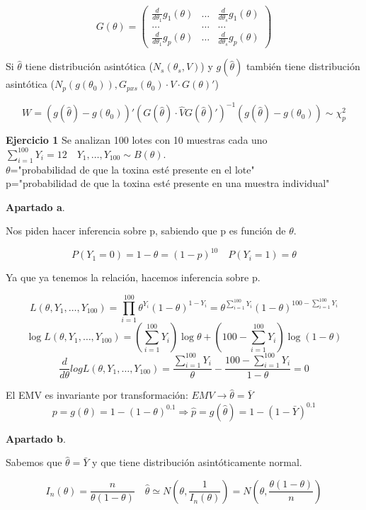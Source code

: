 \[
G(\theta)=
\begin{pmatrix}
    \frac{d}{d \theta_1} g_1(\theta) & \dots & \frac{d}{d \theta_s} g_1(\theta)\\
    \dots &\dots & \dots \\
    \frac{d}{d \theta_1} g_p(\theta) & \dots &\frac{d}{d \theta_s} g_p(\theta)
\end{pmatrix}
\]

Si $\widehat{\theta}$ tiene distribución asintótica ($N_s(\theta_s,V)$)
y $g(\widehat{\theta})$ también tiene distribución asintótica ($N_p(g(\theta_0)),G_{pxs}(\theta_0)\cdot V \cdot G(\theta)'$)

\[
W=(g(\widehat{\theta})-g(\theta_0))'(G(\widehat{\theta})\cdot \widehat{V} G(\widehat{\theta})')^{-1}(g(\widehat{\theta})-g(\theta_0)) \sim \chi^2_p
\]

\textbf{Ejercicio 1}
Se analizan 100 lotes con 10 muestras cada uno $\sum_{i=1}^{100}Y_i=12 \quad Y_1,\dots,Y_{100} \sim B(\theta)$.
\\$\theta$="probabilidad de que la toxina esté presente en el lote"
\\ p="probabilidad de que la toxina esté presente en una muestra individual"

\textbf{Apartado a}.

Nos piden hacer inferencia sobre p, sabiendo que p es función de $\theta$.

\[
P(Y_1=0)=1-\theta=(1-p)^{10} \quad P(Y_i=1)=\theta
\]

Ya que ya tenemos la relación, hacemos inferencia sobre p.

\[
L(\theta,Y_1,\dots,Y_{100})=\prod_{i=1}^{100} \theta^{Y_i}(1-\theta)^{1-Y_i}=\theta^{\sum_{i=1}^{100} Y_i}(1-\theta)^{100-\sum_{i=1}^{100} Y_i}
\]\[ \log L(\theta,Y_1,\dots,Y_{100})=(\sum_{i=1}^{100}Y_i) \log \theta + (100-\sum_{i=1}^{100}Y_i) \log (1-\theta)
\]\[ \frac{d}{d \theta} log L(\theta,Y_1,\dots,Y_{100})= \frac{\sum_{i=1}^{100}Y_i}{\theta} - \frac{100 - \sum_{i=1}^{100}Y_i}{1-\theta}=0
\]

El EMV es invariante por transformación: $EMV \to \widehat{\theta}=\bar{Y}$
\[
    p=g(\theta)=1-(1-\theta)^{0.1}\Longrightarrow \widehat{p}=g(\widehat{\theta})=1-(1-\bar{Y})^{0.1}
\]

\textbf{Apartado b}.

Sabemos que $\widehat{\theta}=\bar{Y}$ y que tiene distribución asintóticamente normal.

\[
I_n(\theta)=\frac{n}{\theta(1-\theta)} \quad \widehat{\theta}\simeq N(\theta,\frac{1}{I_n(\theta)}) = N(\theta,\frac{\theta(1-\theta)}{n})
\]

